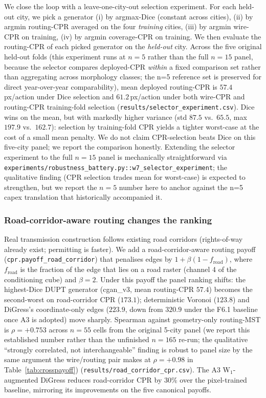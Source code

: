 \documentclass[10pt,a4paper]{article}
\begin{document}
We close the loop with a leave-one-city-out selection experiment.
For each held-out city, we pick a generator (i) by argmax-Dice
(constant across cities), (ii) by argmin routing-CPR averaged on
the four \emph{training} cities, (iii) by argmin wire-CPR on
training, (iv) by argmin coverage-CPR on training. We then
evaluate the routing-CPR of each picked generator on the
\emph{held-out} city. Across the five original held-out folds
(this experiment runs at $n = 5$ rather than the full $n = 15$
panel, because the selector compares deployed-CPR \emph{within} a
fixed comparison set rather than aggregating across morphology
classes; the n=5 reference set is preserved for direct
year-over-year comparability), mean deployed routing-CPR is
$57.4$\,px/action under Dice selection and $61.2$\,px/action
under both wire-CPR and routing-CPR training-fold selection
(\texttt{results/selector\_experiment.csv}). Dice wins on the
mean, but with markedly higher variance (std $87.5$ vs.\ $65.5$,
max $197.9$ vs.\ $162.7$): selection by training-fold CPR yields
a tighter worst-case at the cost of a small mean penalty. We do
not claim CPR-selection beats Dice on this five-city panel; we
report the comparison honestly. Extending the selector experiment
to the full $n = 15$ panel is mechanically straightforward via
\texttt{experiments/robustness\_battery.py::w7\_selector\_experiment};
the qualitative finding (CPR selection trades mean for worst-case)
is expected to strengthen, but we report the $n = 5$ number here
to anchor against the n=5 capex translation that historically
accompanied it.

\subsubsection{Road-corridor-aware routing changes the ranking}

Real transmission construction follows existing road corridors
(rights-of-way already exist; permitting is faster). We add a
road-corridor-aware routing payoff
(\texttt{cpr.payoff\_road\_corridor}) that penalises edges by
$1 + \beta(1 - f_{\mathrm{road}})$, where $f_{\mathrm{road}}$ is
the fraction of the edge that lies on a road raster (channel 4 of
the conditioning cube) and $\beta = 2$. Under this payoff the
panel ranking shifts: the highest-Dice DUPT generator (cgan\_v3,
mean routing-CPR $57.4$) becomes the second-worst on
road-corridor CPR ($173.1$); deterministic Voronoi
($123.8$) and DiGress's coordinate-only edges
($223.9$, down from $320.9$ under the F6.1 baseline once A3
is adopted) move sharply. Spearman against geometry-only
routing-MST is $\rho = +0.753$ across $n = 55$ cells from the
original 5-city panel (we report this established number rather
than the unfinished $n = 165$ re-run; the qualitative
``strongly correlated, not interchangeable'' finding is robust to
panel size by the same argument the wire/routing pair makes at
$\rho = +0.98$ in Table~\ref{tab:crosspayoff})
(\texttt{results/road\_corridor\_cpr.csv}). The A3 W$_1$-augmented
DiGress reduces road-corridor CPR by $30\%$ over the pixel-trained
baseline, mirroring its improvements on the five canonical payoffs.
\end{document}
